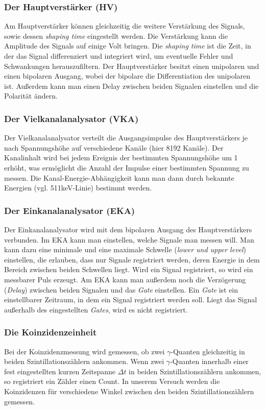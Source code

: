 \subsubsection{Der Hauptverstärker (HV)}

Am Hauptverstärker können gleichzeitig die weitere Verstärkung des Signals, sowie dessen \emph{shaping time} eingestellt werden. Die Verstärkung kann die Amplitude des Signals auf einige Volt bringen.  Die \emph{shaping time} ist die Zeit, in der das Signal differenziert und integriert wird, um eventuelle Fehler und Schwankungen herauszufiltern. Der Hauptverstärker besitzt einen unipolaren und einen bipolaren Ausgang, wobei der bipolare die Differentiation des unipolaren ist. Außerdem kann man einen Delay zwischen beiden Signalen einstellen und die Polarität ändern.

\subsubsection{Der Vielkanalanalysator (VKA)}

Der Vielkanalanalysator verteilt die Ausgangsimpulse des Hauptverstärkers je nach Spannungshöhe auf verschiedene Kanäle (hier 8192 Kanäle). Der Kanalinhalt wird bei jedem Ereignis der bestimmten Spannungshöhe um 1 erhöht, was ermöglicht die Anzahl der Impulse einer bestimmten Spannung zu messen. Die Kanal-Energie-Abhängigkeit kann man dann durch bekannte Energien (vgl. 511keV-Linie) bestimmt werden. %

\subsubsection{Der Einkanalanalysator (EKA)}

Der Einkanalanalysator wird mit dem bipolaren Ausgang des Hauptverstärkers verbunden. Im EKA kann man einstellen, welche Signale man messen will. Man kann dazu eine minimale und eine maximale Schwelle (\emph{lower und upper level}) einstellen, die erlauben, dass nur Signale registriert werden, deren Energie in dem Bereich zwischen beiden Schwellen liegt. Wird ein Signal registriert, so wird ein messbarer Puls erzeugt. Am EKA kann man außerdem noch die Verzögerung (\emph{Delay}) zwischen beiden Signalen und das \emph{Gate} einstellen. Ein \emph{Gate} ist ein einstellbarer Zeitraum, in dem ein Signal registriert werden soll. Liegt das Signal außerhalb des eingestellten \emph{Gates}, wird es nicht registriert. %

\subsubsection{Die Koinzidenzeinheit}

Bei der Koinzidenzmessung wird gemessen, ob zwei $\gamma$-Quanten gleichzeitig in beiden Szintillationszählern ankommen. Wenn zwei $\gamma$-Quanten innerhalb einer fest eingestellten kurzen Zeitspanne $\Delta t$ in beiden Szintillationszählern ankommen, so registriert ein Zähler einen Count. In unserem Versuch werden die Koinzidenzen für verschiedene Winkel zwischen den beiden Szintillationszählern gemessen.
